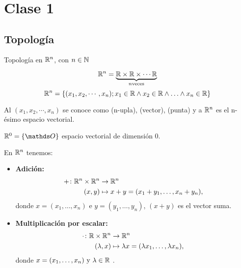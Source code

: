 \chapter{Clase 1}
\section{Topología}

Topología en $\mathbb{R}^{n}$, con $n \in \mathbb{N}$

$$
	\mathbb{R}^{n} =  \underbrace{\mathbb{R} \times \mathbb{R} \times \cdots \mathbb{R} }_{n \text{veces}}
$$
$$
	\mathbb{R}^{n} = \{ (x_1, x_2, \cdots, x_n); x_1 \in \mathbb{R} \wedge  x_2 \in \mathbb{R} \wedge
	\ldots  \wedge  x_n \in \mathbb{R}       \}
$$

Al $(x_1, x_2, \cdots, x_n) $  se conoce como (n-upla), (vector), (punta) y a $\mathbb{R}^{n}$ es el n-ésimo espacio vectorial.

$\Real{0} = \{\Ou\}$  espacio vectorial de dimensión $0$.

En $\mathbb{R}^{n}$ tenemos:

\begin{itemize}
	\item \textbf{Adición:}
	      \begin{align*}
		      +\colon \mathbb{R}^{n} \times \mathbb{R}^{n} & \to \mathbb{R}^{n}                                        \\
		      (x, y)                 & \mapsto x + y = (x_1 + y_1, \dots, x_n + y_n),
	      \end{align*}
	      donde $x = (x_1, \dots, x_n)$ e $y = (y_1, \dots, y_n)$, $(x+y)$ es el vector suma.

	\item \textbf{Multiplicación por escalar:}
	      \begin{align*}
		      \cdot\colon \mathbb{R} \times \mathbb{R}^{n} & \to \mathbb{R}^{n}                                                \\
		      (\lambda, x)              & \mapsto \lambda x = (\lambda x_1, \dots, \lambda x_n),
	      \end{align*}
	      donde $x = (x_1, \dots, x_n) \text{ y } \lambda \in \mathbb{R}$ .
\end{itemize}




